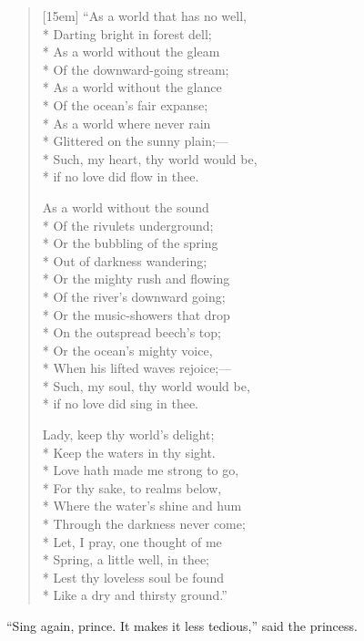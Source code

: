 \documentclass[12pt]{memoir}
\begin{document}
\begin{itshape}
\begin{verse}[15em]
``As a world that has no well,\\*
Darting bright in forest dell;\\*
As a world without the gleam\\*
Of the downward-going stream;\\*
As a world without the glance\\*
Of the ocean's fair expanse;\\*
As a world where never rain\\*
Glittered on the sunny plain;---\\*
Such, my heart, thy world would be,\\*
if no love did flow in thee.

As a world without the sound\\*
Of the rivulets underground;\\*
Or the bubbling of the spring\\*
Out of darkness wandering;\\*
Or the mighty rush and flowing\\*
Of the river's downward going;\\*
Or the music-showers that drop\\*
On the outspread beech's top;\\*
Or the ocean's mighty voice,\\*
When his lifted waves rejoice;---\\*
Such, my soul, thy world would be,\\*
if no love did sing in thee.

Lady, keep thy world's delight;\\*
Keep the waters in thy sight.\\*
Love hath made me strong to go,\\*
For thy sake, to realms below,\\*
Where the water's shine and hum\\*
Through the darkness never come;\\*
Let, I pray, one thought of me\\*
Spring, a little well, in thee;\\*
Lest thy loveless soul be found\\*
Like a dry and thirsty ground.''
\end{verse}
\end{itshape}

``Sing again, prince.  It makes it less tedious,'' said the princess.
\end{document}
